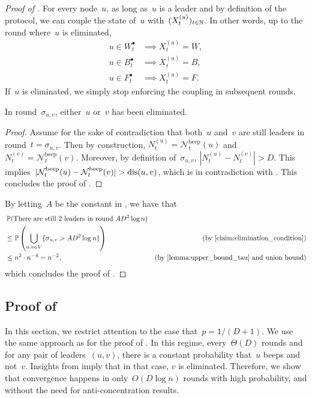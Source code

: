 \documentclass{article}
\newcommand{\lead}{\bullet}
\newcommand{\beepcount}{\mathcal{N}^{\mathrm{beep}}}
\begin{document}
\begin{proof} [Proof of ]
    For every node~$u$, as long as~$u$ is a leader and by definition of the protocol, we can couple the state of~$u$ with~$(X_t^{(u)})_{t \in \operatorname{\mathbb{N}}}$. In other words, up to the round where~$u$ is eliminated,
    \begin{align*}
        u \in W^\lead_t &\implies X_t^{(u)} = W, \\
        u \in B^\lead_t &\implies X_t^{(u)} = B, \\
        u \in F^\lead_t &\implies X_t^{(u)} = F.
    \end{align*}
    If~$u$ is eliminated, we simply stop enforcing the coupling in subsequent rounds.
    \begin{claim} \label{claim:elimination_condition}
        In round~$\sigma_{u,v}$, either~$u$ or~$v$ has been eliminated.
    \end{claim}
    \begin{proof}
        Assume for the sake of contradiction that both~$u$ and~$v$ are still leaders in round~$t = \sigma_{u,v}$.
        Then by construction, $N_t^{(u)} = \beepcount_t(u)$ and $N_t^{(v)} = \beepcount_t(v)$.
        Moreover, by definition of~$\sigma_{u,v}$, $|N_t^{(u)}-N_t^{(v)}| > D$.
        This implies~$|\beepcount_t(u) - \beepcount_t(v)| > \dis(u,v)$, which is in contradiction with .
        This concludes the proof of .
    \end{proof}
    By letting~$A$ be the constant in , we have that
    \begin{align*}
        &\bbP ( \text{There are still 2 leaders in round } AD^2 \log n ) \\
        &\leq \bbP \pa{ \bigcup_{u,v \in V} \{\sigma_{u,v} > AD^2 \log n \} } & \text{(by \Cref{claim:elimination_condition})} \\
        &\leq n^2 \cdot n^{-4} = n^{-2}, & \text{(by \Cref{lemma:upper_bound_tau} and union bound)}
    \end{align*}
    which concludes the proof of .
\end{proof}


\subsection{\texorpdfstring{Proof of }{Proof of Theorem 3}} \label{sec:side_result}

In this section, we restrict attention to the case that~$p = 1/(D+1)$. We use the same approach as for the proof of .
In this regime, every~$\Theta(D)$ rounds and for any pair of leaders~$(u,v)$, there is a constant probability that~$u$ beeps and not~$v$.
Insights from  imply that in that case, $v$ is eliminated.
Therefore, we show that convergence happens in only~$O(D \log n)$ rounds with high probability, and without the need for anti-concentration results.
\end{document}
